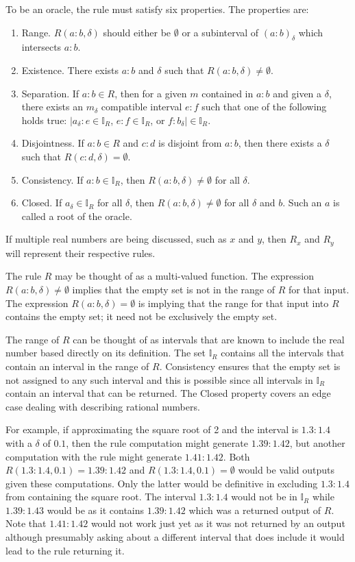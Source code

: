 \documentclass[12pt]{article}
\begin{document}
To be an oracle, the rule must satisfy six properties.  The properties are:
\begin{enumerate}
    \item Range. 
    $R(a:b, \delta)$ should either be $\emptyset$ or a subinterval of $(a:b)_\delta$ which intersects $a:b$. 
    \item Existence. 
    There exists $a:b$ and $\delta$ such that $R(a:b, \delta) \neq \emptyset$.
    \item Separation. 
    If $a:b \in R$, then for a given $m$ contained in $a:b$ and given a $\delta$, there exists an $m_\delta$ compatible interval $e:f$ such that one of the following holds true:  $|a_\delta:e \in \mathbb{I}_R$, $e:f \in \mathbb{I}_R$,  or $f:b_{\delta}| \in \mathbb{I}_R$.
   \item Disjointness. 
   If $a:b \in R$ and $c:d$ is disjoint from $a:b$, then there exists a $\delta$ such that $R(c:d, \delta) = \emptyset$.
    \item Consistency. 
    If $a:b  \in \mathbb{I}_R$, then $R(a:b, \delta) \neq \emptyset$ for all $\delta$.
    \item Closed. 
    If $a_\delta \in \mathbb{I}_R$ for all $\delta $, then $R(a:b, \delta) \neq \emptyset$ for all $\delta$ and $b$. Such an $a$ is called a root of the oracle. 
\end{enumerate}

If multiple real numbers are being discussed, such as $x$ and $y$, then $R_x$ and $R_y$ will represent their respective rules. 

The rule $R$ may be thought of as a multi-valued function. The expression $R(a:b, \delta) \neq \emptyset$ implies that the empty set is not in the range of $R$ for that input. The expression $R(a:b, \delta) = \emptyset$ is implying that the range for that input into $R$ contains the empty set; it need not be exclusively the empty set.

The range of $R$ can be thought of as intervals that are known to include the real number based directly on its definition. The set $\mathbb{I}_R$ contains all the intervals that contain an interval in the range of $R$. Consistency ensures that the empty set is not assigned to any such interval and this is possible since all intervals in $\mathbb{I}_R$ contain an interval that can be returned. The Closed property covers an edge case dealing with describing rational numbers.

 For example, if approximating the square root of 2 and the interval is $1.3:1.4$ with a $\delta$ of $0.1$, then the rule computation might generate $1.39:1.42$, but another computation with the rule might generate $1.41:1.42$. Both $R(1.3:1.4, 0.1) = 1.39:1.42$ and $R(1.3:1.4, 0.1) = \emptyset$ would be valid outputs given these computations. Only the latter would be definitive in excluding $1.3:1.4$ from containing the square root. The interval $1.3:1.4$ would not be in $\mathbb{I}_R$ while $1.39:1.43$ would be as it contains $1.39:1.42$ which was a returned output of $R$. Note that $1.41:1.42$ would not work just yet as it was not returned by an output although presumably asking about a different interval that does include it would lead to the rule returning it. 
\end{document}
